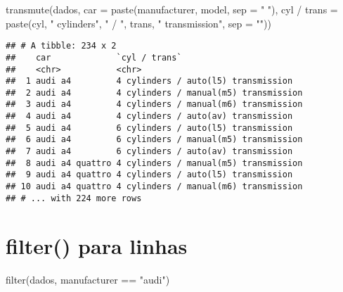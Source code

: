 \documentclass[
]{book}
\newenvironment{Shaded}{\begin{snugshade}}{\end{snugshade}}
\newcommand{\AttributeTok}[1]{\textcolor[rgb]{0.77,0.63,0.00}{#1}}
\newcommand{\FunctionTok}[1]{\textcolor[rgb]{0.00,0.00,0.00}{#1}}
\newcommand{\NormalTok}[1]{#1}
\newcommand{\OtherTok}[1]{\textcolor[rgb]{0.56,0.35,0.01}{#1}}
\newcommand{\SpecialCharTok}[1]{\textcolor[rgb]{0.00,0.00,0.00}{#1}}
\newcommand{\StringTok}[1]{\textcolor[rgb]{0.31,0.60,0.02}{#1}}
\begin{document}
\begin{Shaded}
\begin{Highlighting}[]
\FunctionTok{transmute}\NormalTok{(dados,}
          \AttributeTok{car =} \FunctionTok{paste}\NormalTok{(manufacturer, model, }\AttributeTok{sep =} \StringTok{" "}\NormalTok{),}
          \StringTok{\textasciigrave{}}\AttributeTok{cyl / trans}\StringTok{\textasciigrave{}} \OtherTok{=} \FunctionTok{paste}\NormalTok{(cyl, }\StringTok{" cylinders"}\NormalTok{, }\StringTok{" / "}\NormalTok{, trans, }\StringTok{" transmission"}\NormalTok{, }\AttributeTok{sep =} \StringTok{""}\NormalTok{))}
\end{Highlighting}
\end{Shaded}

\begin{verbatim}
## # A tibble: 234 x 2
##    car             `cyl / trans`                        
##    <chr>           <chr>                                
##  1 audi a4         4 cylinders / auto(l5) transmission  
##  2 audi a4         4 cylinders / manual(m5) transmission
##  3 audi a4         4 cylinders / manual(m6) transmission
##  4 audi a4         4 cylinders / auto(av) transmission  
##  5 audi a4         6 cylinders / auto(l5) transmission  
##  6 audi a4         6 cylinders / manual(m5) transmission
##  7 audi a4         6 cylinders / auto(av) transmission  
##  8 audi a4 quattro 4 cylinders / manual(m5) transmission
##  9 audi a4 quattro 4 cylinders / auto(l5) transmission  
## 10 audi a4 quattro 4 cylinders / manual(m6) transmission
## # ... with 224 more rows
\end{verbatim}

\hypertarget{filter-para-linhas}{%
\section{filter() para linhas}\label{filter-para-linhas}}

\begin{Shaded}
\begin{Highlighting}[]
\FunctionTok{filter}\NormalTok{(dados, manufacturer }\SpecialCharTok{==} \StringTok{"audi"}\NormalTok{) }
\end{Highlighting}
\end{Shaded}
\end{document}
